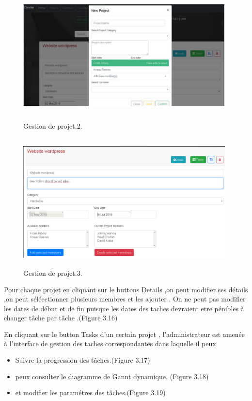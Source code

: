 \begin{figure}[H]
\center
\includegraphics[width=11cm,height=7cm]{./figures/pres/gp2.png}
\caption{Gestion de projet.2.}
\end{figure}



\begin{figure}[H]
\center
\includegraphics[width=11cm,height=7cm]{./figures/pres/gp3.png}
\caption{Gestion de projet.3.}
\end{figure}


Pour chaque projet en cliquant sur le buttons Details ,on peut modifier ses
d\'{e}tails ,on peut s\'{e}l\'{e}ectionner plusieurs membres et les ajouter .
On ne peut pas modifier les dates de d\'{e}but et de fin puisque les dates des
taches devraient etre p\'{e}nibles \`{a} changer t\^{a}che par t\^{a}che .(Figure 3.16)

\bigskip
\bigskip

En cliquant sur le button \guillemotleft{} Tasks \guillemotright{} d'un certain projet , l'administrateur est
amen\'{e}e \`{a} l'interface de gestion des taches correspondantes dans laquelle il
peux
\begin{itemize}
  \item { Suivre la progression des t\^{a}ches.(Figure 3.17)  }
  \item{peux consulter le diagramme de Gannt dynamique. (Figure 3.18)}
  \item {  et modifier les param\'{e}tres des t\^{a}ches.(Figure 3.19) }
\end{itemize}




